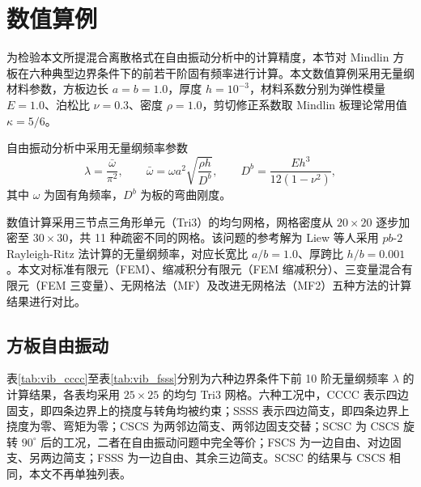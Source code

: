 
\section{数值算例}

为检验本文所提混合离散格式在自由振动分析中的计算精度，本节对 Mindlin 方板在六种典型边界条件下的前若干阶固有频率进行计算。本文数值算例采用无量纲材料参数，方板边长 $a=b=1.0$，厚度 $h=10^{-3}$，材料系数分别为弹性模量 $E=1.0$、泊松比 $\nu=0.3$、密度 $\rho=1.0$，剪切修正系数取 Mindlin 板理论常用值 $\kappa=5/6$。

自由振动分析中采用无量纲频率参数
\begin{equation}
\lambda = \frac{\bar{\omega}}{\pi^2}, \qquad \bar{\omega} = \omega a^2 \sqrt{\frac{\rho h}{D^b}}, \qquad D^b = \frac{E h^3}{12(1-\nu^2)},
\end{equation}
其中 $\omega$ 为固有角频率，$D^b$ 为板的弯曲刚度。

数值计算采用三节点三角形单元（Tri3）的均匀网格，网格密度从 $20\times20$ 逐步加密至 $30\times30$，共 11 种疏密不同的网格。该问题的参考解\cite{liew1993}为 Liew 等人采用 $pb$-$2$ Rayleigh-Ritz 法计算的无量纲频率，对应长宽比 $a/b=1.0$、厚跨比 $h/b=0.001$。本文对标准有限元（FEM）、缩减积分有限元（FEM 缩减积分）、三变量混合有限元（FEM 三变量）、无网格法（MF）及改进无网格法（MF2）五种方法的计算结果进行对比。

\subsection{方板自由振动}

表\ref{tab:vib_cccc}至表\ref{tab:vib_fsss}分别为六种边界条件下前 10 阶无量纲频率 $\lambda$ 的计算结果，各表均采用 $25\times25$ 的均匀 Tri3 网格。六种工况中，CCCC 表示四边固支，即四条边界上的挠度与转角均被约束；SSSS 表示四边简支，即四条边界上挠度为零、弯矩为零；CSCS 为两邻边简支、两邻边固支交替；SCSC 为 CSCS 旋转 $90^\circ$ 后的工况，二者在自由振动问题中完全等价；FSCS 为一边自由、对边固支、另两边简支；FSSS 为一边自由、其余三边简支。SCSC 的结果与 CSCS 相同，本文不再单独列表。

